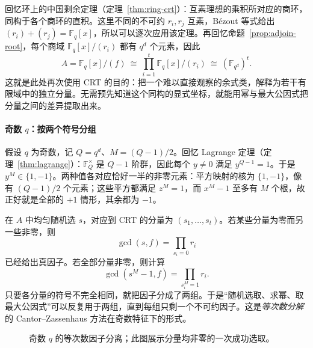 \documentclass[lang=cn,a4paper,fontset=none,zihao=false,10pt,openany,twoside]{beautybook}
\numberwithin{algorithm}{chapter}
\begin{document}
回忆环上的中国剩余定理（定理~\ref{thm:ring-crt}）：互素理想的乘积所对应的商环，同构于各个商环的直积。这里不同的不可约 $r_i,r_j$ 互素，Bézout 等式给出 $(r_i)+(r_j)=\mathbb F_q[x]$，所以可以逐次应用该定理。再回忆命题~\ref{prop:adjoin-root}，每个商域 $\mathbb F_q[x]/(r_i)$ 都有 $q^d$ 个元素，因此
\[
 A=\mathbb F_q[x]/(f)
 \ \cong\ \prod_{i=1}^t\mathbb F_q[x]/(r_i)
 \ \cong\ (\mathbb F_{q^d})^t.
\]
这就是此处再次使用 CRT 的目的：把一个难以直接观察的余式类，解释为若干有限域中的独立分量。无需预先知道这个同构的显式坐标，就能用幂与最大公因式把分量之间的差异提取出来。

\paragraph{奇数 $q$：按两个符号分组}
假设 $q$ 为奇数，记 $Q=q^d$、$M=(Q-1)/2$。回忆 Lagrange 定理（定理~\ref{thm:lagrange}）：$\mathbb F_Q^\times$ 是 $Q-1$ 阶群，因此每个 $y\ne0$ 满足 $y^{Q-1}=1$。于是 $y^M\in\{1,-1\}$。两种值各对应恰好一半的非零元素：平方映射的核为 $\{1,-1\}$，像有 $(Q-1)/2$ 个元素；这些平方都满足 $z^M=1$，而 $x^M-1$ 至多有 $M$ 个根，故正好就是全部的 $+1$ 情形，其余都为 $-1$。

在 $A$ 中均匀随机选 $s$，对应到 CRT 的分量为 $(s_1,\ldots,s_t)$。若某些分量为零而另一些非零，则
\[
 \gcd(s,f)=\prod_{s_i=0}r_i
\]
已经给出真因子。若全部分量非零，则计算
\[
 \gcd(s^M-1,f)=\prod_{s_i^M=1}r_i.
\]
只要各分量的符号不完全相同，就把因子分成了两组。于是“随机选取、求幂、取最大公因式”可以反复用于两组，直到每组只剩一个不可约因子。这是\emph{等次数分解}的 Cantor--Zassenhaus 方法在奇数特征下的形式。

\begin{figure}[H]
\centering
{}
\caption{奇数 $q$ 的等次数因子分离；此图展示分量均非零的一次成功选取。}
\label{fig:equal-degree-split}
\end{figure}
\end{document}
